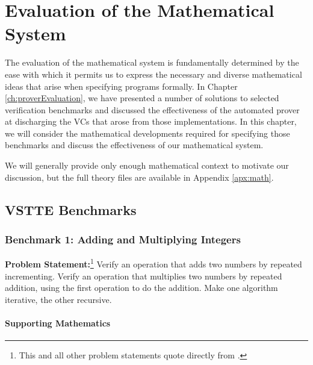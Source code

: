 


\chapter{Evaluation of the Mathematical System\label{ch:mathEvaluation}}
The evaluation of the mathematical system is fundamentally determined by the ease with which it permits us to express the necessary and diverse mathematical ideas that arise when specifying programs formally.  In Chapter \ref{ch:proverEvaluation}, we have presented a number of solutions to selected verification benchmarks and discussed the effectiveness of the automated prover at discharging the VCs that arose from those implementations.  In this chapter, we will consider the mathematical developments required for specifying those benchmarks and discuss the effectiveness of our mathematical system.

We will generally provide only enough mathematical context to motivate our discussion, but the full theory files are available in Appendix \ref{apx:math}.


\section{VSTTE Benchmarks}

	\subsection{Benchmark 1: Adding and Multiplying Integers}	

\textbf{Problem Statement:}\footnote{This and all other problem statements quote directly from \cite{Benchmarks}.} Verify an operation that adds two numbers by repeated incrementing. Verify an operation that multiplies two numbers by repeated addition, using the first operation to do the addition. Make one algorithm iterative, the other recursive.

		\subsubsection{Supporting Mathematics}	

